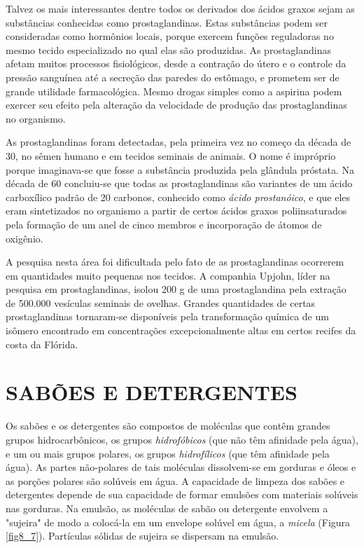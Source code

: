 Talvez os mais interessantes dentre todos os derivados dos ácidos graxos sejam as substâncias conhecidas como prostaglandinas. Estas substâncias podem ser consideradas como hormônios locais, porque exercem funções reguladoras no mesmo tecido especializado no qual elas são produzidas. As prostaglandinas afetam muitos processos fisiológicos, desde a contração do útero e o controle da pressão sanguínea até a secreção das paredes do estômago, e prometem ser de grande utilidade farmacológica. Mesmo drogas simples como a aspirina podem exercer seu efeito pela alteração da velocidade de produção das prostaglandinas no organismo.

As prostaglandinas foram detectadas, pela primeira vez no começo da década de 30, no sêmen humano e em tecidos seminais de animais. O nome é impróprio porque imaginava-se que fosse a substância produzida pela glândula próstata. Na década de 60 concluiu-se que todas as prostaglandinas são variantes de um ácido carboxílico padrão de 20 carbonos, conhecido como \textit{ácido prostanóico}, e que eles eram sintetizados no organismo a partir de certos ácidos graxos poliinsaturados pela formação de um anel de cinco membros e incorporação de átomos de oxigênio.

A pesquisa nesta área foi dificultada pelo fato de as prostaglandinas ocorrerem em quantidades muito pequenas nos tecidos. A companhia Upjohn, líder na pesquisa em prostaglandinas, isolou 200 g de uma prostaglandina pela extração de 500.000 vesículas seminais de ovelhas. Grandes quantidades de certas prostaglandinas tornaram-se disponíveis pela transformação química de um isômero encontrado em concentrações excepcionalmente altas em certos recifes da costa da Flórida.

\section{SABÕES E DETERGENTES}

Os sabões e os detergentes são compostos de moléculas que contêm grandes grupos hidrocarbônicos, os grupos \textit{hidrofóbicos} (que não têm afinidade pela água), e um ou mais grupos polares, os grupos \textit{hidrofílicos} (que têm afinidade pela água). As partes não-polares de tais moléculas dissolvem-se em gorduras e óleos e as porções polares são solúveis em água. A capacidade de limpeza dos sabões e detergentes depende de sua capacidade de formar emulsões com materiais solúveis nas gorduras. Na emulsão, as moléculas de sabão ou detergente envolvem a "sujeira" de modo a colocá-la em um envelope solúvel em água, a \textit{micela} (Figura \ref{fig8_7}). Partículas sólidas de sujeira se dispersam na emulsão.
\par\bigskip

